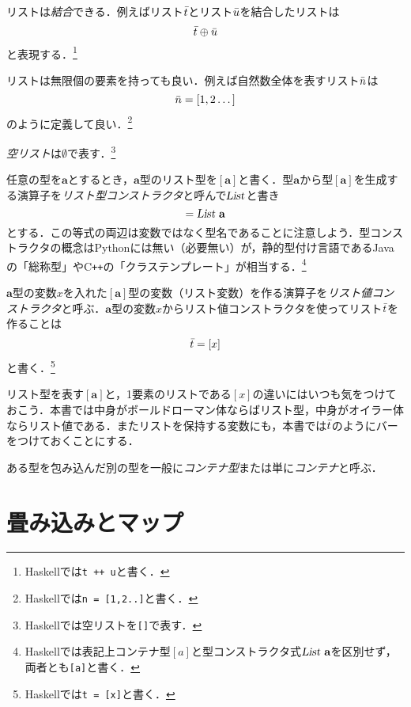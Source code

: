\documentclass[twocolumn]{jsbook}
\newcommand{\programminglanguage}[1]{\textsf{#1}}
\newcommand{\cxx}{\programminglanguage{C}\texttt{++}}
\newcommand{\haskell}{\programminglanguage{Haskell}}
\newcommand{\python}{\programminglanguage{Python}}
\newcommand{\code}[1]{\texttt{#1}}
\newcommand{\keyword}[1]{{\emph{#1}}}
\newcommand{\hsklType}[1]{\textbf{#1}}
\newcommand{\hsklTypeConstructor}[1]{\textsl{#1}}
\newcommand{\hsklAppend}{\oplus}
\DeclareMathOperator{\hsklListConstructor}{\hsklTypeConstructor{List}}
\newcommand{\hsklEmptyList}{\emptyset}
\newcommand{\hsklListType}[1]{[#1]}
\newcommand{\hsklTypeConstruct}[2]{#1\,#2}
\newcommand{\hsklList}[1]{\Bar{#1}}
\begin{document}
リストは\keyword{結合}できる．例えばリスト$\hsklList{t}$とリスト$\hsklList{u}$を結合したリストは
\begin{equation*}
\hsklList{t}\hsklAppend\hsklList{u}
\end{equation*}
と表現する．\footnote{\haskell では\code{t ++ u}と書く．}

リストは無限個の要素を持っても良い．例えば自然数全体を表すリスト$\hsklList{n}$は
\begin{equation}
\hsklList{n}=[1,2\dots]
\end{equation}
のように定義して良い．\footnote{\haskell では\code{n = [1,2..]}と書く．}

\keyword{空リスト}は$\hsklEmptyList$で表す．\footnote{\haskell では空リストを\code{[]}で表す．}

任意の型を$\hsklType{a}$とするとき，$\hsklType{a}$型のリスト型を$\hsklListType{\hsklType{a}}$と書く．型$\hsklType{a}$から型$\hsklListType{\hsklType{a}}$を生成する演算子を\keyword{リスト型コンストラクタ}と呼んで$\hsklListConstructor$と書き
\begin{equation}
\hsklListType{\hsklType{a}}=\hsklTypeConstruct{\hsklListConstructor}{\hsklType{a}}
\end{equation}
とする．この等式の両辺は変数ではなく型名であることに注意しよう．型コンストラクタの概念は\python には無い（必要無い）が，静的型付け言語であるJavaの「総称型」や\cxx の「クラステンプレート」が相当する．\footnote{\haskell では表記上コンテナ型$\hsklListType{a}$と型コンストラクタ式$\hsklTypeConstruct{\hsklListConstructor}{\hsklType{a}}$を区別せず，両者とも\code{[a]}と書く．}

$\hsklType{a}$型の変数$x$を入れた$\hsklListType{\hsklType{a}}$型の変数（リスト変数）を作る演算子を\keyword{リスト値コンストラクタ}と呼ぶ．$\hsklType{a}$型の変数$x$からリスト値コンストラクタを使ってリスト$\hsklList{t}$を作ることは
\begin{equation}
\hsklList{t}=[x]
\end{equation}
と書く．\footnote{\haskell では\code{t = [x]}と書く．}

リスト型を表す$\hsklListType{\hsklType{a}}$と，1要素のリストである$[x]$の違いにはいつも気をつけておこう．本書では中身がボールドローマン体ならばリスト型，中身がオイラー体ならリスト値である．またリストを保持する変数にも，本書では$\hsklList{t}$のようにバーをつけておくことにする．

ある型を包み込んだ別の型を一般に\keyword{コンテナ型}または単に\keyword{コンテナ}と呼ぶ．

\section{畳み込みとマップ}
\end{document}
